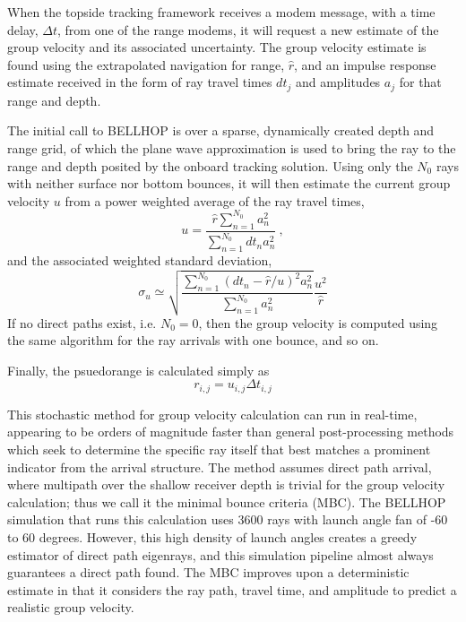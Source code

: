 When the topside tracking framework receives a modem message, with a time delay, $\Delta t$, from one of the range modems, it will request a new estimate of the group velocity and its associated uncertainty.
The group velocity estimate is found using the extrapolated navigation for range, $\hat{r}$, and an impulse response estimate received in the form of ray travel times $dt_{j}$ and amplitudes $a_{j}$ for that range and depth.

The initial call to BELLHOP is over a sparse, dynamically created depth and range grid, of which the plane wave approximation is used to bring the ray to the range and depth posited by the onboard tracking solution.
Using only the $N_0$ rays with neither surface nor bottom bounces, it will then estimate the current group velocity $u$ from a power weighted average of the ray travel times,
\begin{equation}
u = \frac{\hat{r} \sum_{n=1}^{N_{0}} a_{n}^{2}}{\sum_{n=1}^{N_{0}} dt_{n}a_{n}^{2}} ~, 
\end{equation}
and the associated weighted standard deviation,
\begin{equation}
\sigma_{u} \simeq \sqrt{\frac {\sum_{n=1}^{N_{0}} (dt_{n}-\hat{r}/u)^{2}a_{n}^{2}}{ \sum_{n=1}^{N_{0}} a_{n}^{2}} } \frac{u^{2}}{\hat{r}}
\end{equation}
If no direct paths exist, i.e. $N_{0}=0$, then the group velocity is computed using the same algorithm for the ray arrivals with one bounce, and so on.

Finally, the psuedorange is calculated simply as
\begin{equation}
r_{i,j} = u_{i,j} \Delta t_{i,j} 
\end{equation}

This stochastic method for group velocity calculation can run in real-time, appearing to be orders of magnitude faster than general post-processing methods which seek to determine the specific ray itself that best matches a prominent indicator from the arrival structure.
The method assumes direct path arrival, where multipath over the shallow receiver depth is trivial for the group velocity calculation; thus we call it the minimal bounce criteria (MBC).
The BELLHOP simulation that runs this calculation uses 3600 rays with launch angle fan of -60 to 60 degrees.
However, this high density of launch angles creates a greedy estimator of direct path eigenrays, and this simulation pipeline almost always guarantees a direct path found.
The MBC improves upon a deterministic estimate in that it considers the ray path, travel time, and amplitude to predict a realistic group velocity.

